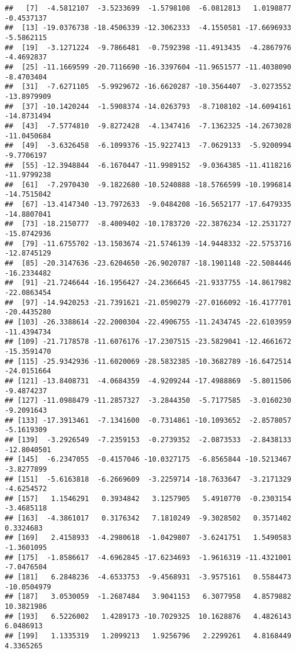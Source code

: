 \documentclass[
]{article}
\begin{document}
\begin{verbatim}
##   [7]  -4.5812107  -3.5233699  -1.5798108  -6.0812813   1.0198877  -0.4537137
##  [13] -19.0376738 -18.4506339 -12.3062333  -4.1550581 -17.6696933  -5.5862115
##  [19]  -3.1271224  -9.7866481  -0.7592398 -11.4913435  -4.2867976  -4.4692837
##  [25] -11.1669599 -20.7116690 -16.3397604 -11.9651577 -11.4038090  -8.4703404
##  [31]  -7.6271105  -5.9929672 -16.6620287 -10.3564407  -3.0273552 -13.8979909
##  [37] -10.1420244  -1.5908374 -14.0263793  -8.7108102 -14.6094161 -14.8731494
##  [43]  -7.5774810  -9.8272428  -4.1347416  -7.1362325 -14.2673028 -11.0450684
##  [49]  -3.6326458  -6.1099376 -15.9227413  -7.0629133  -5.9200994  -9.7706197
##  [55] -12.3948844  -6.1670447 -11.9989152  -9.0364385 -11.4118216 -11.9799238
##  [61]  -7.2970430  -9.1822680 -10.5240888 -18.5766599 -10.1996814 -14.7515042
##  [67] -13.4147340 -13.7972633  -9.0484208 -16.5652177 -17.6479335 -14.8807041
##  [73] -18.2150777  -8.4009402 -10.1783720 -22.3876234 -12.2531727 -15.0742936
##  [79] -11.6755702 -13.1503674 -21.5746139 -14.9448332 -22.5753716 -12.8745129
##  [85] -20.3147636 -23.6204650 -26.9020787 -18.1901148 -22.5084446 -16.2334482
##  [91] -21.7246644 -16.1956427 -24.2366645 -21.9337755 -14.8617982 -22.0863454
##  [97] -14.9420253 -21.7391621 -21.0590279 -27.0166092 -16.4177701 -20.4435280
## [103] -26.3388614 -22.2000304 -22.4906755 -11.2434745 -22.6103959 -11.4394734
## [109] -21.7178578 -11.6076176 -17.2307515 -23.5829041 -12.4661672 -15.3591470
## [115] -25.9342936 -11.6020069 -28.5832385 -10.3682789 -16.6472514 -24.0151664
## [121] -13.8408731  -4.0684359  -4.9209244 -17.4988869  -5.8011506  -9.4874237
## [127] -11.0988479 -11.2857327  -3.2844350  -5.7177585  -3.0160230  -9.2091643
## [133] -17.3913461  -7.1341600  -0.7314861 -10.1093652  -2.8578057  -5.1619309
## [139]  -3.2926549  -7.2359153  -0.2739352  -2.0873533  -2.8438133 -12.8040501
## [145]  -6.2347055  -0.4157046 -10.0327175  -6.8565844 -10.5213467  -3.8277899
## [151]  -5.6163818  -6.2669609  -3.2259714 -18.7633647  -3.2171329  -4.6254572
## [157]   1.1546291   0.3934842   3.1257905   5.4910770  -0.2303154  -3.4685118
## [163]  -4.3861017   0.3176342   7.1810249  -9.3028502   0.3571402   0.3324683
## [169]   2.4158933  -4.2980618  -1.0429807  -3.6241751   1.5490583  -1.3601095
## [175]  -1.8586617  -4.6962845 -17.6234693  -1.9616319 -11.4321001  -7.0476504
## [181]   6.2848236  -4.6533753  -9.4568931  -3.9575161   0.5584473 -10.0504979
## [187]   3.0530059  -1.2687484   3.9041153   6.3077958   4.8579882  10.3821986
## [193]   6.5226002   1.4289173 -10.7029325  10.1628876   4.4826143   6.0486913
## [199]   1.1335319   1.2099213   1.9256796   2.2299261   4.8168449   4.3365265

\end{verbatim}
\end{document}
